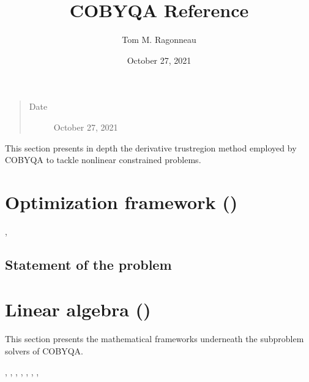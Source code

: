 \documentclass[letterpaper,10pt,english]{sphinxmanual}
\title{COBYQA Reference}
\date{October 27, 2021}
\author{Tom M. Ragonneau}
\begin{document}
\pagestyle{empty}
\sphinxmaketitle
\pagestyle{plain}
\sphinxtableofcontents
\pagestyle{normal}
\label{\detokenize{algo/index::doc}}

\begin{quote}\begin{description}
\item[{Date}] \leavevmode
\sphinxAtStartPar
October 27, 2021

\end{description}\end{quote}

\sphinxAtStartPar
This section presents in depth the derivative trust\sphinxhyphen{}region method employed by
COBYQA to tackle nonlinear constrained problems.


\chapter{Optimization framework ()}
\label{\detokenize{algo/optimize:optimization-framework-cobyqa}}\label{\detokenize{algo/optimize:optimize}}\label{\detokenize{algo/optimize::doc}}

\nopagebreak


\sphinxAtStartPar
{},




\section{Statement of the problem}
\label{\detokenize{algo/optimize:statement-of-the-problem}}\label{\detokenize{algo/optimize:bibliography-1}}

\chapter{Linear algebra ()}
\label{\detokenize{algo/linalg:linear-algebra-cobyqa-linalg}}\label{\detokenize{algo/linalg:linalg}}\label{\detokenize{algo/linalg::doc}}
\sphinxAtStartPar
This section presents the mathematical frameworks underneath the subproblem
solvers of COBYQA.


\nopagebreak


\sphinxAtStartPar
{},
,
,
,
,
,
,
\end{document}
